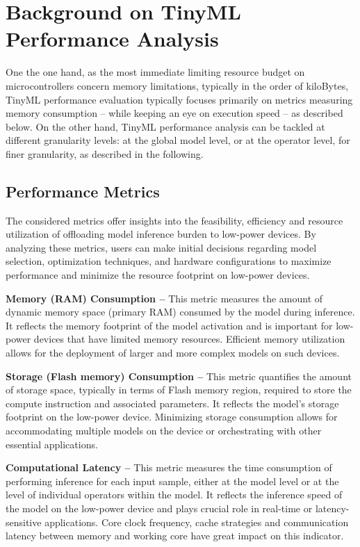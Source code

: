 
\section{Background on TinyML Performance Analysis}

One the one hand, as the most immediate limiting resource budget on microcontrollers concern memory limitations, typically in the order of kiloBytes, TinyML performance evaluation typically focuses primarily on metrics measuring memory consumption -- while keeping an eye on execution speed -- as described below.
On the other hand, TinyML performance analysis can be tackled at different granularity levels: at the global model level, or at the operator level, for finer granularity, as described in the following.

\subsection{Performance Metrics}
The considered metrics offer insights into the feasibility, efficiency and resource utilization of offloading model inference burden to low-power devices. By analyzing these metrics, users can make initial decisions regarding model  selection, optimization techniques, and hardware configurations to maximize performance and minimize the resource footprint on low-power devices.

{\bf Memory (RAM) Consumption --}
This metric measures the amount of dynamic memory space (primary RAM) consumed by the model during inference. It reflects the memory footprint of the model activation and is important for low-power devices that have limited memory resources. Efficient memory utilization allows for the deployment of larger and more complex models on such devices.

{\bf Storage (Flash memory) Consumption --}
This metric quantifies the amount of storage space, typically in terms of Flash memory region, required to store the compute instruction and associated parameters. It reflects the model's storage footprint on the low-power device. Minimizing storage consumption allows for accommodating multiple models on the device or orchestrating with other essential applications.

{\bf Computational Latency --}
This metric measures the time consumption  of performing inference for each input sample, either at the model level or at the level of individual operators within the model. It reflects the inference speed of the model on the low-power device and plays crucial role in real-time or latency-sensitive applications. Core clock frequency, cache strategies and communication latency between memory and working core have great impact on this indicator.

